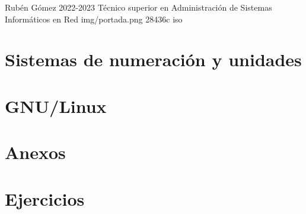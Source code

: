 \documentclass{\ClassPath/yukibook}
\begin{document}
    {Rubén Gómez}  %
    {2022-2023}    %
    {Técnico superior en Administración de \linebreak Sistemas Informáticos en Red} %
    {}%
    {}%
    {img/portada.png} %
    {28436c}
    {iso} %

    \coverpage

    \tableofcontents

    \part{Sistemas de numeración y unidades}
    \graphicspath{{../../../temas_comunes/sistemas_de_numeracion/img/}}
    

    \graphicspath{{../../../temas_comunes/unidades_informacion/img/}}
    

    \vfill
    \pagebreak
    \part{GNU/Linux}
    \graphicspath{{../../../temas_comunes/gnu_linux/img}}
    
    
    

    \part{Anexos}

    \graphicspath{{../../../anexos/virtualbox_networking/img}}
    

    \graphicspath{{../../../anexos/instalar_ubuntu_lts/img/}}
    

    \graphicspath{{../../../anexos/gestion_backups/img}}
    

    

    \graphicspath{{../../../anexos/}}
    

    \part{Ejercicios}
    
\end{document}
